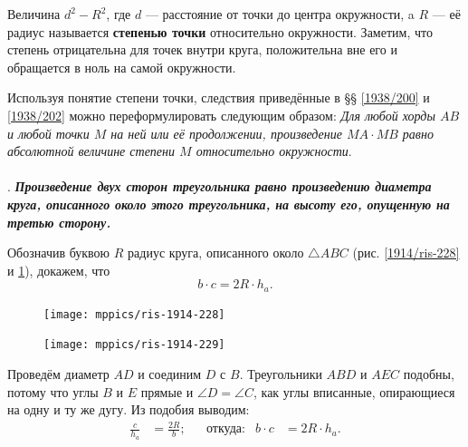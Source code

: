 \documentclass[twoside]{book}
\makeatletter
\newcommand{\rindex}[2][\imki@jobname]{%
  \index[#1]{\detokenize{#2}}%
}
\makeatother
\begin{document}
Величина $d^2- R^2$, где $d$ — расстояние от точки до центра окружности, a $R$ — её радиус называется \rindex{степень точки}\textbf{степенью точки} относительно окружности.
Заметим, что степень отрицательна для точек внутри круга,
положительна вне его и обращается в ноль на самой окружности.

Используя понятие степени точки, следствия приведённые в §§ \ref{1938/200} и \ref{1938/202} можно переформулировать следующим образом:
\emph{Для любой хорды $AB$ и любой точки $M$ на ней или её продолжении, произведение $MA\cdot MB$ равно абсолютной величине степени $M$ относительно окружности}.

\paragraph{}\label{1914/250}. \textbf{\emph{Произведение двух сторон треугольника равно произведению диаметра круга, описанного около этого треугольника, на высоту его, опущенную на третью сторону.}}

Обозначив буквою $R$ радиус круга, описанного около $\triangle ABC$ (рис. \ref{1914/ris-228} и \ref{1914/ris-229}), докажем, что
\[b\cdot c=2R\cdot h_a.\]

\begin{figure}[h!]
\begin{minipage}{.48\textwidth}
\centering
\texttt{[image: mppics/ris-1914-228]}
\end{minipage}
\hfill
\begin{minipage}{.48\textwidth}
\centering
\texttt{[image: mppics/ris-1914-229]}
\end{minipage}

\medskip

\begin{minipage}{.48\textwidth}
\centering
\caption{}\label{1914/ris-228}
\end{minipage}
\hfill
\begin{minipage}{.48\textwidth}
\centering
\caption{}\label{1914/ris-229}
\end{minipage}
\vskip-4mm
\end{figure}

Проведём диаметр $AD$ и соединим $D$ с $B$.
Треугольники $ABD$ и $AEC$ подобны, потому что углы $B$ и $E$ прямые и $\angle D=\angle C$, как углы вписанные, опирающиеся на одну и ту же дугу.
Из подобия выводим:
\begin{align*}
\frac{c}{h_a}&=\frac{2R}{b};
&&\text{откуда:}
&b\cdot c&=2R\cdot h_a.
\end{align*}
\end{document}
